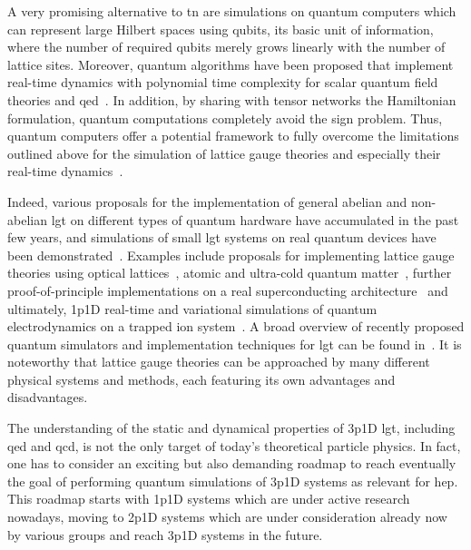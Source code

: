 A very promising alternative to \gls{tn} are simulations on quantum computers which can represent large Hilbert spaces using qubits, its basic unit of information, where the number of required qubits merely grows linearly with the number of lattice sites. Moreover, quantum algorithms have been proposed that implement real-time dynamics with polynomial time complexity for scalar quantum field theories and \gls{qed}~\cite{Byrnes2006, Jordan2012, Mathis2020}. 
In addition, by sharing with tensor networks the Hamiltonian formulation, quantum computations completely avoid the sign problem. 
Thus, quantum computers offer a potential framework to fully overcome the limitations outlined above for the simulation of lattice gauge theories and especially their real-time dynamics~\cite{Feynman1982}. 

Indeed, various proposals for the implementation of general abelian and non-abelian \gls{lgt} on different types of quantum hardware have accumulated in the past few years, and simulations of small \gls{lgt} systems on real quantum devices have been demonstrated~\cite{Banuls2019SimulatingLG,Banuls2019,Klco2019,Atas2021,Ciavarella2021,Clemente2022a}. Examples include proposals for implementing lattice gauge theories using optical lattices~\cite{Banerjee2012,Tagliacozzo2013,Tagliacozzo2013a}, atomic and ultra-cold quantum matter~\cite{Buchler2005,Zohar2011,Zohar2012,Hauke2013,Zohar2013a,Zohar2013c,Banerjee2013,Zohar2015a,Laflamme2015,Gonzalez-Cuadra2017,Rico2018,Zache2018}, further proof-of-principle implementations on a real superconducting architecture~\cite{Klco2018,Klco2019,Atas2021,Ciavarella2021,Mazzola2021} and ultimately, \gls{1p1D} real-time and variational simulations of quantum electrodynamics on a trapped ion system~\cite{Martinez2016, Kokail2019}. A broad overview of recently proposed quantum simulators and implementation techniques for \gls{lgt} can be found in~\cite{Dalmonte2016,Banuls2019SimulatingLG,Banuls2019}. It is noteworthy that lattice gauge theories can be approached by many different physical systems and methods, each featuring its own advantages and disadvantages.

The understanding of the static and dynamical properties of \gls{3p1D} \gls{lgt}, including \gls{qed} and \gls{qcd}, is not the only target of today's theoretical particle physics. In fact, one has to consider an exciting but also demanding roadmap to reach eventually the goal of performing quantum simulations of \gls{3p1D} systems as relevant for \gls{hep}. This roadmap starts with \gls{1p1D} systems which are under active research nowadays, moving to \gls{2p1D} systems which are under consideration already now by various groups and reach \gls{3p1D} systems in the future. 

